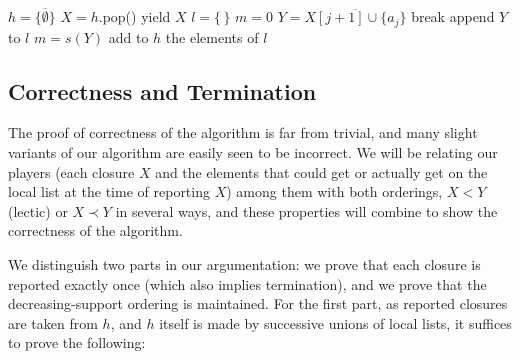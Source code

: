 \documentclass{article}
\newcommand{\st}[1]{%
  \sbox0{#1}%
  \usebox0%
  \llap{\rule[0.5ex]{\wd0}{0.4pt}}%
}
\def\bef{\prec}
\begin{document}
\begin{algorithm}
\caption{{\sc Troppus} {taken from an "Algorithms" 
section that we had, compare I guess simply
delete it here. The text contained two versions, not identical
but essentially the same.}} %
  \begin{algorithmic}[1]
    \STATE $h = \{\overline{\emptyset}\}$ 
    	\STATE $X = h$.pop() 
    	\STATE yield $X$
    	\STATE $l=\{\, \}$ %
    	\STATE $m=0$
    		\STATE $Y=\overline{X[j+1] \cup \{a_j\}}$
    					\STATE break
    				\ELSE
      					\STATE append $Y$ to $l$
      					\STATE $m=s(Y)$
         			\ENDIF
        	\ENDIF
      \ENDFOR
		 \STATE add to $h$ the elements of $l$
    \ENDWHILE
  \end{algorithmic}
\end{algorithm}



\subsection{Correctness and Termination}\label{sec:CorTer}

The proof of correctness of the algorithm is far from trivial, and
many slight variants of our algorithm
are easily seen to be incorrect.
We will be relating our
players (each closure $X$ and the elements that 
could get or actually get on the local list at
the time of reporting $X$) among them with both
orderings, $X<Y$ (lectic) or $X\bef Y$ in several
ways, and these properties will combine to show
the correctness of the algorithm.


We distinguish two parts in our argumentation: we prove that each
closure is reported exactly once
(which also implies termination), 
and we prove that the decreasing-support
ordering is maintained. For the first part, as reported closures
are taken from $h$, and $h$ itself is made by successive unions
of local lists, it suffices to prove the following:
\end{document}
